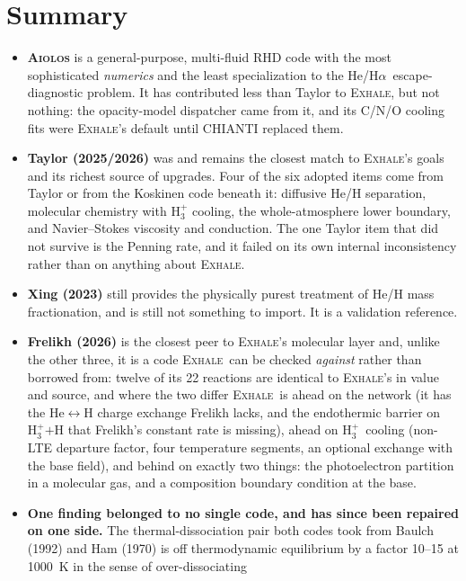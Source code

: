 \documentclass[english,a4paper]{my_memo}
\newcommand{\EXHALE}{\textsc{Exhale}}
\newcommand{\AIOLOS}{\textsc{Aiolos}}
\newcommand{\Ha}{H$\alpha$}
\newcommand{\Hth}{\ensuremath{\mathrm{H}_3^+}}
\begin{document}
\section{Summary}

\begin{itemize}[nosep]
  \item \textbf{\AIOLOS} is a general-purpose, multi-fluid RHD code with the
    most sophisticated \emph{numerics} and the least specialization to the
    He/\Ha\ escape-diagnostic problem. It has contributed less than Taylor to
    \EXHALE, but not nothing: the opacity-model dispatcher came from it, and
    its C/N/O cooling fits were \EXHALE's default until CHIANTI replaced them.
  \item \textbf{Taylor (2025/2026)} was and remains the closest match to
    \EXHALE's goals and its richest source of upgrades. Four of the six adopted
    items come from Taylor or from the Koskinen code beneath it: diffusive He/H
    separation, molecular chemistry with H$_3^+$ cooling, the whole-atmosphere
    lower boundary, and Navier--Stokes viscosity and conduction. The one
    Taylor item that did not survive is the Penning rate, and it failed on its
    own internal inconsistency rather than on anything about \EXHALE.
  \item \textbf{Xing (2023)} still provides the physically purest treatment of
    He/H mass fractionation, and is still not something to import. It is a
    validation reference.
  \item \textbf{Frelikh (2026)} is the closest peer to \EXHALE's molecular
    layer and, unlike the other three, it is a code \EXHALE\ can be checked
    \emph{against} rather than borrowed from: twelve of its 22 reactions are
    identical to \EXHALE's in value and source, and where the two differ
    \EXHALE\ is ahead on the network (it has the He$\leftrightarrow$H charge
    exchange Frelikh lacks, and the endothermic barrier on \Hth$ + $H that
    Frelikh's constant rate is missing), ahead on \Hth\ cooling (non-LTE
    departure factor, four temperature segments, an optional exchange with the
    base field), and behind on exactly two things: the photoelectron partition
    in a molecular gas, and a composition boundary condition at the base.
  \item \textbf{One finding belonged to no single code, and has since been
    repaired on one side.} The thermal-dissociation pair both codes took from
    Baulch (1992) and Ham (1970) is off thermodynamic equilibrium by a factor
    10--15 at 1000~K in the sense of over-dissociating

\end{itemize}
\end{document}
